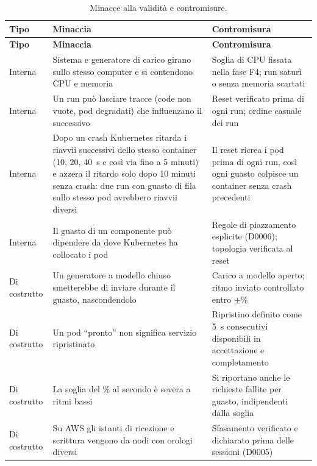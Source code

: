 \begin{longtable}{@{}>{\raggedright\arraybackslash}p{2.3cm}QQ@{}}
\caption{Minacce alla validità e contromisure.}
\label{tab:limiti} \\
\toprule
\textbf{Tipo} & \textbf{Minaccia} & \textbf{Contromisura} \\
\midrule
\endfirsthead
\toprule
\textbf{Tipo} & \textbf{Minaccia} & \textbf{Contromisura} \\
\midrule
\endhead
\bottomrule
\endlastfoot
Interna & Sistema e generatore di carico girano sullo stesso computer e si contendono CPU e memoria & Soglia di CPU fissata nella fase F4; run saturi o senza memoria scartati \\
Interna & Un run può lasciare tracce (code non vuote, pod degradati) che influenzano il successivo & Reset verificato prima di ogni run; ordine casuale dei run \\
Interna & Dopo un crash Kubernetes ritarda i riavvii successivi dello stesso container (10, 20, 40~s e così via fino a 5 minuti) e azzera il ritardo solo dopo 10 minuti senza crash: due run con guasto di fila sullo stesso pod avrebbero riavvii diversi & Il reset ricrea i pod prima di ogni run, così ogni guasto colpisce un container senza crash precedenti \\
Interna & Il guasto di un componente può dipendere da dove Kubernetes ha collocato i pod & Regole di piazzamento esplicite (D0006); topologia verificata al reset \\
Di costrutto & Un generatore a modello chiuso smetterebbe di inviare durante il guasto, nascondendolo & Carico a modello aperto; ritmo inviato controllato entro $\pm$\% \\
Di costrutto & Un pod ``pronto'' non significa servizio ripristinato & Ripristino definito come 5~s consecutivi disponibili in accettazione e completamento \\
Di costrutto & La soglia del \% al secondo è severa a ritmi bassi & Si riportano anche le richieste fallite per guasto, indipendenti dalla soglia \\
Di costrutto & Su AWS gli istanti di ricezione e scrittura vengono da nodi con orologi diversi & Sfasamento verificato e dichiarato prima delle sessioni (D0005) \\

\end{longtable}
